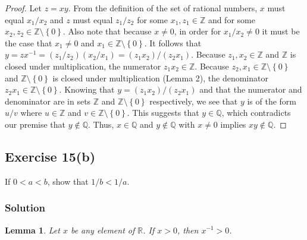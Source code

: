 \documentclass[12pt]{article}
\newtheorem{lem}{Lemma}
\begin{document}
\begin{itemize}
\begin{proof}
Let $z = xy$. From the definition of the set of rational numbers, $x$ must equal $x_1/x_2$ and $z$ must equal $z_1/z_2$ for some $x_1, z_1 \in \mathbb{Z}$ and for some $x_2, z_2 \in \mathbb{Z} \setminus \left\{0\right\}$. Also note that because $x \neq 0$, in order for $x_1/x_2 \neq 0$ it must be the case that $x_1 \neq 0$ and $x_1 \in \mathbb{Z} \setminus \left\{0\right\}$. It follows that $y = zx^{-1} = \left(z_1/z_2\right)\left(x_2/x_1\right) = \left(z_1 x_2\right)/\left(z_2 x_1\right)$. Because $z_1, x_2 \in \mathbb{Z}$ and $\mathbb{Z}$ is closed under multiplication, the numerator $z_1 x_2 \in \mathbb{Z}$. Because $z_2, x_1 \in \mathbb{Z} \setminus \left\{0\right\}$ and $\mathbb{Z} \setminus \left\{0\right\}$ is closed under multiplication (Lemma 2), the denominator $z_2 x_1 \in \mathbb{Z} \setminus \left\{0\right\}$. Knowing that $y = \left(z_1 x_2\right)/\left(z_2 x_1\right)$ and that the numerator and denominator are in sets $\mathbb{Z}$ and $\mathbb{Z} \setminus \left\{0\right\}$ respectively, we see that $y$ is of the form $u/v$ where $u \in \mathbb{Z}$ and $v \in \mathbb{Z} \setminus \left\{0\right\}$. This suggests that $y \in \mathbb{Q}$, which contradicts our premise that $y \notin \mathbb{Q}$. Thus, $x \in \mathbb{Q}$ and $y \notin \mathbb{Q}$ with $x \neq 0$ implies $xy \notin \mathbb{Q}$.
\end{proof}
\end{itemize}

\subsection*{Exercise 15(b)}
If $0 < a < b$, show that $1/b < 1/a$.

%
%
%

\subsubsection*{Solution}
\begin{lem}
Let $x$ be any element of $\mathbb{R}$. If $x > 0$, then $x^{-1} > 0$.
\end{lem}
\end{document}
